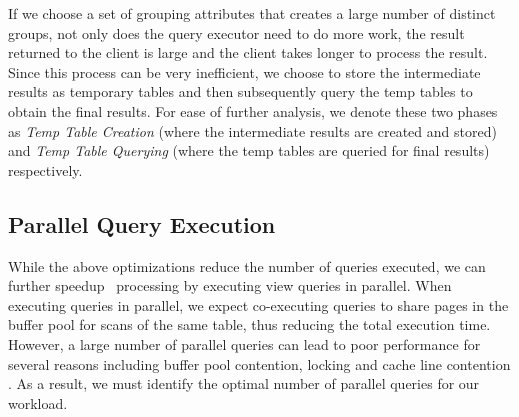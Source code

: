  
  
  If we choose a set of grouping attributes that creates a large number of
  distinct groups, not only does the query executor need to do more work, the result
  returned to the client is large and the client takes longer to process the
  result. Since this process can be very inefficient, we choose to store
  the intermediate results as temporary tables and then subsequently query the
  temp tables to obtain the final results. For ease of further analysis, we
  denote these two phases as {\it Temp Table Creation} (where the
  intermediate results are created and stored) and {\it Temp Table Querying}
  (where the temp tables are queried for final results) respectively.
  

  \subsection {Parallel Query Execution}
  \label{subsec:parallel_exec}
  While the above optimizations reduce the number of queries executed, we can
  further speedup \SeeDB\ processing by executing view queries in parallel. When
  executing queries in parallel, we expect co-executing queries to share pages in the
  buffer pool for scans of the same table, thus reducing the total execution
  time. However, a large number of parallel queries can lead to poor
  performance for several reasons including buffer pool contention, locking and
  cache line contention \cite{Postgres_wiki}. As a result, we must identify the
  optimal number of parallel queries for our workload.
  
  
